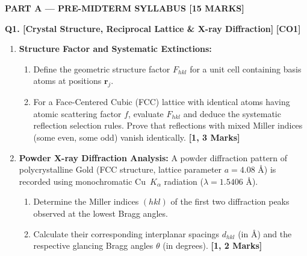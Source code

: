 \documentclass[11pt,a4paper]{article}
\begin{document}
\vspace{4pt}
\begin{center}
    {\large\bfseries PART A --- PRE-MIDTERM SYLLABUS [15 MARKS]}
\end{center}
\vspace{-4pt}

\noindent\textbf{Q1. [Crystal Structure, Reciprocal Lattice \& X-ray Diffraction]} \hfill \textbf{[CO1]}
\begin{enumerate}[label=(\alph*),leftmargin=1.8em,itemsep=3pt]
    \item \textbf{Structure Factor and Systematic Extinctions:}
    \begin{enumerate}[label=(\roman*),itemsep=1.5pt]
        \item Define the geometric structure factor $F_{hkl}$ for a unit cell containing basis atoms at positions $\mathbf{r}_j$.
        \item For a Face-Centered Cubic (FCC) lattice with identical atoms having atomic scattering factor $f$, evaluate $F_{hkl}$ and deduce the systematic reflection selection rules. Prove that reflections with mixed Miller indices (some even, some odd) vanish identically. \hfill\textbf{[1, 3 Marks]}
    \end{enumerate}

    \item \textbf{Powder X-ray Diffraction Analysis:}
    A powder diffraction pattern of polycrystalline Gold (FCC structure, lattice parameter $a = 4.08\text{ \AA}$) is recorded using monochromatic Cu~$K_\alpha$ radiation ($\lambda = 1.5406\text{ \AA}$).
    \begin{enumerate}[label=(\roman*),itemsep=1.5pt]
        \item Determine the Miller indices $(hkl)$ of the first two diffraction peaks observed at the lowest Bragg angles.
        \item Calculate their corresponding interplanar spacings $d_{hkl}$ (in \AA) and the respective glancing Bragg angles $\theta$ (in degrees). \hfill\textbf{[1, 2 Marks]}
    \end{enumerate}
\end{enumerate}
\end{document}
